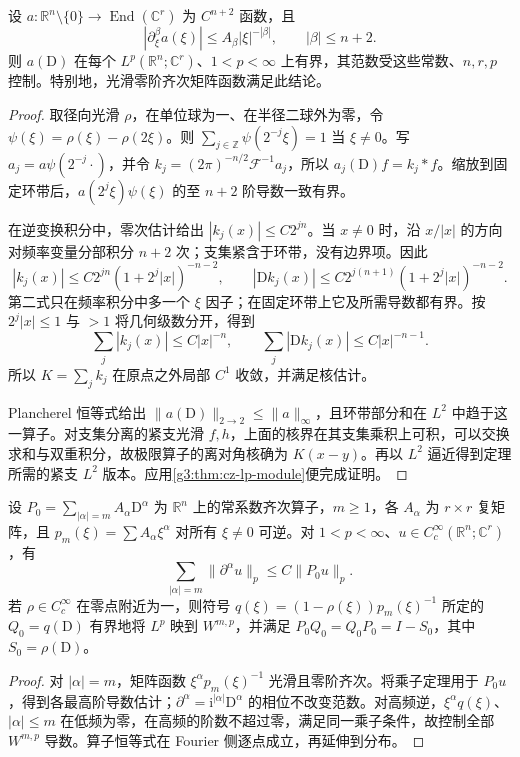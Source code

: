 \begin{theorem}\label{g3:thm:smooth-multiplier-lp}
	设 \(a:\mathbb R^n\setminus\{0\}\to\operatorname{End}(\mathbb C^r)\) 为 \(C^{n+2}\) 函数，且
	\[
		|\partial_\xi^\beta a(\xi)|\le A_\beta|\xi|^{-|\beta|},\qquad |\beta|\le n+2.
	\]
	则 \(a(\mathrm D)\) 在每个 \(L^p(\mathbb R^n;\mathbb C^r)\)、\(1<p<\infty\) 上有界，其范数受这些常数、\(n,r,p\) 控制。特别地，光滑零阶齐次矩阵函数满足此结论。
\end{theorem}
\begin{proof}
	取径向光滑 \(\rho\)，在单位球为一、在半径二球外为零，令 \(\psi(\xi)=\rho(\xi)-\rho(2\xi)\)。则 \(\sum_{j\in\mathbb Z}\psi(2^{-j}\xi)=1\) 当 \(\xi\ne0\)。写 \(a_j=a\psi(2^{-j}\cdot)\)，并令 \(k_j=(2\pi)^{-n/2}\mathcal F^{-1}a_j\)，所以 \(a_j(\mathrm D)f=k_j*f\)。缩放到固定环带后，\(a(2^j\xi)\psi(\xi)\) 的至 \(n+2\) 阶导数一致有界。

	在逆变换积分中，零次估计给出 \(|k_j(x)|\le C2^{jn}\)。当 \(x\ne0\) 时，沿 \(x/|x|\) 的方向对频率变量分部积分 \(n+2\) 次；支集紧含于环带，没有边界项。因此
	\[
		|k_j(x)|\le C2^{jn}(1+2^j|x|)^{-n-2},\qquad
		|\mathrm Dk_j(x)|\le C2^{j(n+1)}(1+2^j|x|)^{-n-2}.
	\]
	第二式只在频率积分中多一个 \(\xi\) 因子；在固定环带上它及所需导数都有界。按 \(2^j|x|\le1\) 与 \(>1\) 将几何级数分开，得到
	\[
		\sum_j|k_j(x)|\le C|x|^{-n},\qquad
		\sum_j|\mathrm Dk_j(x)|\le C|x|^{-n-1}.
	\]
	所以 \(K=\sum_jk_j\) 在原点之外局部 \(C^1\) 收敛，并满足核估计。

	Plancherel 恒等式给出 \(\|a(\mathrm D)\|_{2\to2}\le\|a\|_\infty\)，且环带部分和在 \(L^2\) 中趋于这一算子。对支集分离的紧支光滑 \(f,h\)，上面的核界在其支集乘积上可积，可以交换求和与双重积分，故极限算子的离对角核确为 \(K(x-y)\)。再以 \(L^2\) 逼近得到定理所需的紧支 \(L^2\) 版本。应用\cref{g3:thm:cz-lp-module}便完成证明。
\end{proof}

\begin{corollary}\label{g3:cor:constant-elliptic-lp}
	设 \(P_0=\sum_{|\alpha|=m}A_\alpha\mathrm D^\alpha\) 为 \(\mathbb R^n\) 上的常系数齐次算子，\(m\ge1\)，各 \(A_\alpha\) 为 \(r\times r\) 复矩阵，且 \(p_m(\xi)=\sum A_\alpha\xi^\alpha\) 对所有 \(\xi\ne0\) 可逆。对 \(1<p<\infty\)、\(u\in C_c^\infty(\mathbb R^n;\mathbb C^r)\)，有
	\[
		\sum_{|\alpha|=m}\|\partial^\alpha u\|_p\le C\|P_0u\|_p.
	\]
	若 \(\rho\in C_c^\infty\) 在零点附近为一，则符号 \(q(\xi)=(1-\rho(\xi))p_m(\xi)^{-1}\) 所定的 \(Q_0=q(\mathrm D)\) 有界地将 \(L^p\) 映到 \(W^{m,p}\)，并满足
	\(P_0Q_0=Q_0P_0=I-S_0\)，其中 \(S_0=\rho(\mathrm D)\)。
\end{corollary}
\begin{proof}
	对 \(|\alpha|=m\)，矩阵函数 \(\xi^\alpha p_m(\xi)^{-1}\) 光滑且零阶齐次。将乘子定理用于 \(P_0u\)，得到各最高阶导数估计；\(\partial^\alpha=\mathrm i^{|\alpha|}\mathrm D^\alpha\) 的相位不改变范数。对高频逆，\(\xi^\alpha q(\xi)\)、\(|\alpha|\le m\) 在低频为零，在高频的阶数不超过零，满足同一乘子条件，故控制全部 \(W^{m,p}\) 导数。算子恒等式在 Fourier 侧逐点成立，再延伸到分布。
\end{proof}

